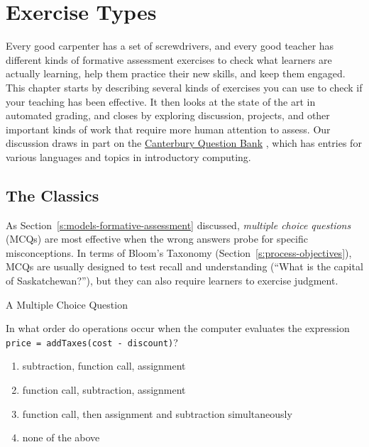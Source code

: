 \chapter{Exercise Types}\label{s:exercises}

Every good carpenter has a set of screwdrivers, and every good teacher
has different kinds of formative assessment exercises to check what
learners are actually learning, help them practice their new skills, and
keep them engaged. This chapter starts by describing several kinds of
exercises you can use to check if your teaching has been effective. It
then looks at the state of the art in automated grading, and closes by
exploring discussion, projects, and other important kinds of work that
require more human attention to assess. Our discussion draws in part on
the \href{http://web-cat.org/questionbank/}{Canterbury Question Bank}
\cite{Sand2013}, which has entries for various languages and topics
in introductory computing.

\section{The Classics}\label{s:exercises-classics}

As Section~\ref{s:models-formative-assessment} discussed, \emph{multiple
choice questions} (MCQs) are most effective when the wrong answers probe
for specific misconceptions. In terms of Bloom's Taxonomy
(Section~\ref{s:process-objectives}), MCQs are usually designed to test
recall and understanding (``What is the capital of Saskatchewan?''), but
they can also require learners to exercise judgment.

\begin{aside}{A Multiple Choice Question}

In what order do operations occur when the computer evaluates the
expression \texttt{price\ =\ addTaxes(cost\ -\ discount)}?

\begin{enumerate}
\item
  subtraction, function call, assignment
\item
  function call, subtraction, assignment
\item
  function call, then assignment and subtraction simultaneously
\item
  none of the above
\end{enumerate}

\end{aside}

